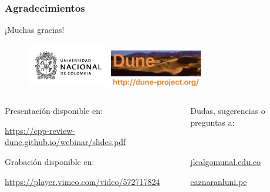 \begin{frame}
	\frametitle{Agradecimientos}
	\begin{center}\Huge
		¡Muchas gracias!
	\end{center}
	\begin{figure}[ht!]
		\centering
		\href{https://unal.edu.co}{\includegraphics[height=1.9cm]{unal}}\quad
		\href{https://dune-project.org}{\includegraphics[height=1.6cm]{dune-logo}}
	\end{figure}
	\vfill
	\begin{columns}
		\begin{column}{0.5\textwidth}
			\textcolor{c++reviewduneblue}{Presentación disponible en:}
			\begin{center}
				\href{https://cpp-review-dune.github.io/webinar/slides.pdf}{\url{https://cpp-review-dune.github.io/webinar/slides.pdf}}
			\end{center}
			\textcolor{c++reviewduneblue}{Grabación disponible en:}
			\begin{center}
				\href{https://player.vimeo.com/video/572717824}{\url{https://player.vimeo.com/video/572717824}}
			\end{center}
		\end{column}
		\hfill
		\begin{column}{0.5\textwidth}
			\begin{flushright}
				Dudas, sugerencias o preguntas a:

				\

				\href{mailto:jlealgom@unal.edu.co}{jlealgom\MVAt unal.edu.co}

				\href{mailto:caznaranl@uni.pe}{caznaranl\MVAt uni.pe}
			\end{flushright}
		\end{column}
	\end{columns}

\end{frame}